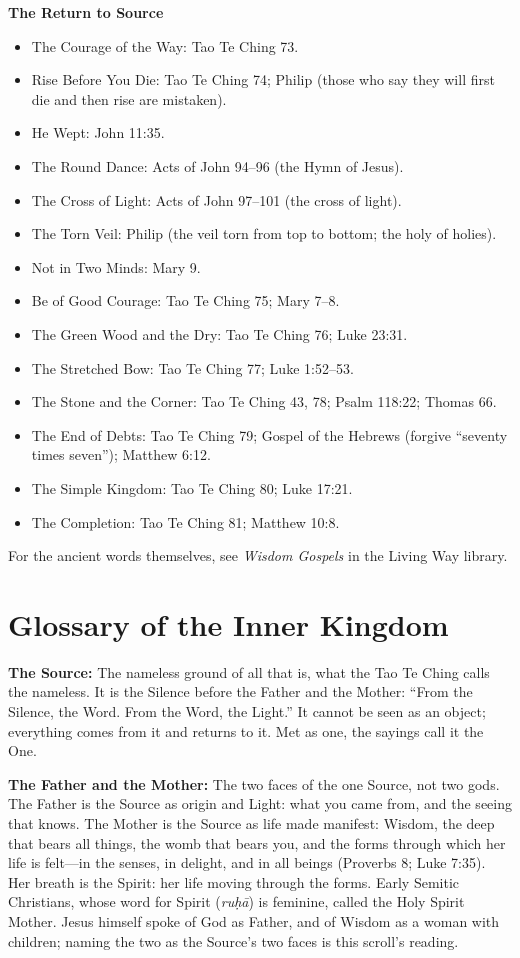 \documentclass[10pt, openright]{book}
\providecommand{\tightlist}{\setlength{\itemsep}{0pt}\setlength{\parskip}{0pt}}
\begin{document}
\textbf{The Return to Source}

\begin{itemize}
\tightlist
\item
  The Courage of the Way: Tao Te Ching 73.
\item
  Rise Before You Die: Tao Te Ching 74; Philip (those who say they will
  first die and then rise are mistaken).
\item
  He Wept: John 11:35.
\item
  The Round Dance: Acts of John 94--96 (the Hymn of Jesus).
\item
  The Cross of Light: Acts of John 97--101 (the cross of light).
\item
  The Torn Veil: Philip (the veil torn from top to bottom; the holy of
  holies).
\item
  Not in Two Minds: Mary 9.
\item
  Be of Good Courage: Tao Te Ching 75; Mary 7--8.
\item
  The Green Wood and the Dry: Tao Te Ching 76; Luke 23:31.
\item
  The Stretched Bow: Tao Te Ching 77; Luke 1:52--53.
\item
  The Stone and the Corner: Tao Te Ching 43, 78; Psalm 118:22; Thomas
  66.
\item
  The End of Debts: Tao Te Ching 79; Gospel of the Hebrews (forgive
  ``seventy times seven''); Matthew 6:12.
\item
  The Simple Kingdom: Tao Te Ching 80; Luke 17:21.
\item
  The Completion: Tao Te Ching 81; Matthew 10:8.
\end{itemize}

For the ancient words themselves, see \emph{Wisdom Gospels} in the
Living Way library.

\chapter{Glossary of the Inner
Kingdom}\label{glossary-of-the-inner-kingdom}

\textbf{The Source:} The nameless ground of all that is, what the Tao Te
Ching calls the nameless. It is the Silence before the Father and the
Mother: ``From the Silence, the Word. From the Word, the Light.'' It
cannot be seen as an object; everything comes from it and returns to it.
Met as one, the sayings call it the One.

\textbf{The Father and the Mother:} The two faces of the one Source, not
two gods. The Father is the Source as origin and Light: what you came
from, and the seeing that knows. The Mother is the Source as life made
manifest: Wisdom, the deep that bears all things, the womb that bears
you, and the forms through which her life is felt---in the senses, in
delight, and in all beings (Proverbs 8; Luke 7:35). Her breath is the
Spirit: her life moving through the forms. Early Semitic Christians,
whose word for Spirit (\emph{ruḥā}) is feminine, called the Holy Spirit
Mother. Jesus himself spoke of God as Father, and of Wisdom as a woman
with children; naming the two as the Source's two faces is this scroll's
reading.
\end{document}
